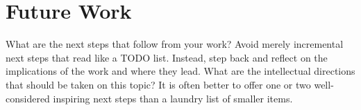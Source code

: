\section{Future Work}
What are the  next steps that follow from your work? 
Avoid merely incremental next steps that read like a TODO list. 
Instead, step back and reflect on the implications of the work and where they lead. 
What are the intellectual directions that should be taken on this topic? 
It is often better to offer one or two well-considered inspiring next steps than a laundry list of smaller items.